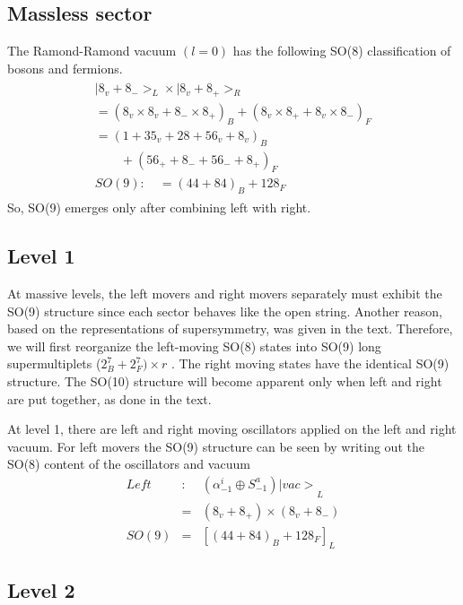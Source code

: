 \subsection{Massless sector}

The Ramond-Ramond vacuum $\left( l=0\right) $ has the following SO(8)
classification of bosons and fermions.
\begin{eqnarray}
\begin{array}{l}
|8_v+8_{-}>_L\times |8_v+8_{+}>_R \\
=(8_v\times 8_v+8_{-}\times 8_{+})_B+(8_v\times 8_{+}+8_v\times 8_{-})_F \\
=(1+35_v+28+56_v+8_v)_B \\
\quad \quad +(56_{+}+8_{-}+56_{-}+8_{+})_F \\
{SO(9):\quad }=(44+84)_B+128_F\quad
\end{array}
\label{vacuum}
\end{eqnarray}
So, SO(9) emerges only after combining left with right.

\subsection{Level 1}

At massive levels, the left movers and right movers separately must exhibit
the SO(9) structure since each sector behaves like the open string. Another
reason, based on the representations of supersymmetry, was given in the
text. Therefore, we will first reorganize the left-moving SO(8) states into
SO(9) long supermultiplets ($2_B^7+2_F^7)\times r$ . The right moving states
have the identical SO(9) structure. The SO(10) structure will become
apparent only when left and right are put together, as done in the text.

At level 1, there are left and right moving oscillators applied on the left
and right vacuum. For left movers the SO(9) structure can be seen by writing
out the SO(8) content of the oscillators and vacuum
\begin{eqnarray}
{{{{Left}}}} &:&{{{(\alpha _{-1}^i\oplus S_{-1}^a)|{vac}>}}}_L
\label{left1} \\
&=&{{{\left( 8_v+8_{+}\right) \times \left( 8_v+8_{-}\right) }}}  \nonumber
\\
SO(9) &=&{\left[ (44+84)_B+128_F\right] _L}  \nonumber
\end{eqnarray}

\subsection{Level 2}

